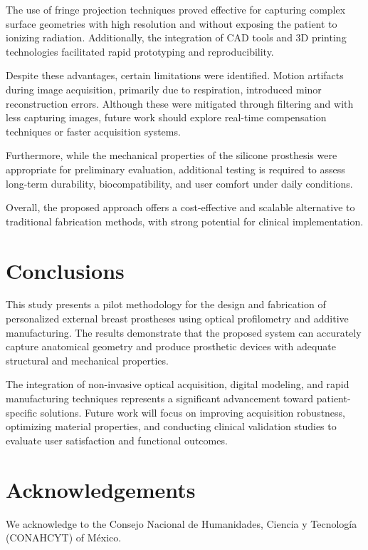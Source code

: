 \documentclass{article}
\begin{document}
The use of fringe projection techniques proved effective for capturing complex surface geometries with high resolution and without exposing the patient to ionizing radiation. Additionally, the integration of CAD tools and 3D printing technologies facilitated rapid prototyping and reproducibility.

Despite these advantages, certain limitations were identified. Motion artifacts during image acquisition, primarily due to respiration, introduced minor reconstruction errors. Although these were mitigated through filtering and with less capturing images, future work should explore real-time compensation techniques or faster acquisition systems.

Furthermore, while the mechanical properties of the silicone prosthesis were appropriate for preliminary evaluation, additional testing is required to assess long-term durability, biocompatibility, and user comfort under daily conditions.

Overall, the proposed approach offers a cost-effective and scalable alternative to traditional fabrication methods, with strong potential for clinical implementation.

\section{Conclusions}
	
This study presents a pilot methodology for the design and fabrication of personalized external breast prostheses using optical profilometry and additive manufacturing. The results demonstrate that the proposed system can accurately capture anatomical geometry and produce prosthetic devices with adequate structural and mechanical properties.

The integration of non-invasive optical acquisition, digital modeling, and rapid manufacturing techniques represents a significant advancement toward patient-specific solutions. Future work will focus on improving acquisition robustness, optimizing material properties, and conducting clinical validation studies to evaluate user satisfaction and functional outcomes.

\section{Acknowledgements}
	We acknowledge to the Consejo Nacional de Humanidades, Ciencia y Tecnología (CONAHCYT) of México.  
	
\end{document}
